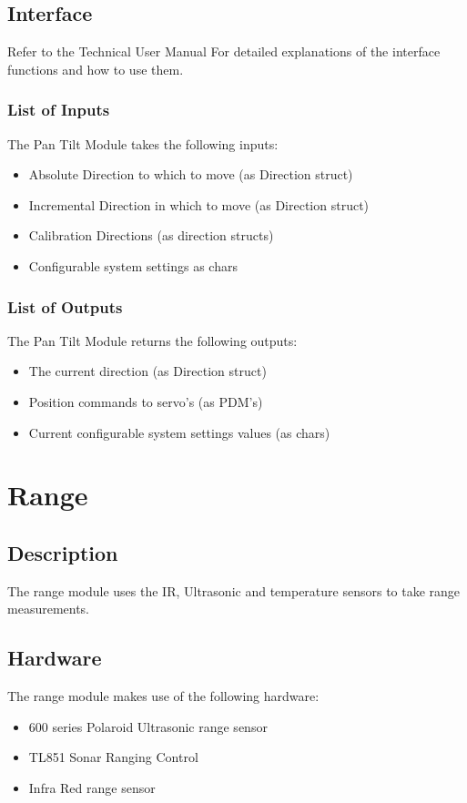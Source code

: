 \documentclass[]{report}
\begin{document}
\subsection{Interface}
Refer to the Technical User Manual For detailed explanations of the interface functions and how to use them.

\subsubsection{List of Inputs}
The Pan Tilt Module takes the following inputs:
\begin{itemize}
	\item Absolute Direction to which to move (as Direction struct)
	\item Incremental Direction in which to move (as Direction struct)
	\item Calibration Directions (as direction structs)
	\item Configurable system settings as chars
\end{itemize}

\subsubsection{List of Outputs}
The Pan Tilt Module returns the following outputs:
\begin{itemize}
	\item The current direction (as Direction struct)
	\item Position commands to servo's (as PDM's)
	\item Current configurable system settings values (as chars)
\end{itemize}

\section{Range}
\subsection{Description}
The range module uses the IR, Ultrasonic and temperature sensors to take range measurements.

\subsection{Hardware}
The range module makes use of the following hardware:
\begin{itemize}
	\item 600 series Polaroid Ultrasonic range sensor
	\item TL851 Sonar Ranging Control
	\item Infra Red range sensor
\end{itemize}
\end{document}

